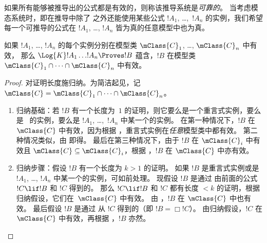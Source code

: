 \documentclass[../../../include/open-logic-section]{subfiles}
\begin{document}


如果所有能够被推导出的公式都是有效的，则称该推导系统是\emph{可靠的}。
当考虑模态系统时，即在推导中除了  之外还能使用某些公式 $!A_1$, \dots,~$!A_n$ 的实例，我们希望每一个可推导的公式在 $!A_1$, \dots, $!A_n$ 皆为真的任意模型中也为真。

\begin{thm}[可靠性定理]
  如果 $!A_1$, \dots, $!A_n$ 的每个实例分别在模型类 $\mClass{C}_1$, \dots, $\mClass{C}_n$ 中有效，
  那么 $\Log{K}!A_1\dots !A_n
  \Proves !B$ 蕴含，$!B$ 在模型类 $\mClass{C}_1 \cap \dots \cap \mClass{C}_n$ 中有效。
\end{thm}

\begin{proof}
  对证明长度施归纳。为简洁起见，记 $\mClass{C} =
  \mClass{C}_1 \cap \dots \cap \mClass{C}_n$。
  \begin{enumerate}
  \item 归纳基础：若 $!B$ 有一个长度为~$1$ 的证明，则它要么是一个重言式实例，要么是~ 的实例，要么是 $!A_1$, \dots,~$!A_n$ 中某一个的实例。
      在第一种情况下，$!B$ 在 $\mClass{C}$ 中有效，因为根据 ，重言式实例在\emph{任意}模型类中都有效。
      第二种情况类似，由  即得。
      最后在第三种情况下，由于 $!B$ 在 $\mClass{C}_i$ 中有效且 $\mClass{C} \subseteq
    \mClass{C}_i$，根据 ，$!B$ 在 $\mClass{C}$ 中亦有效。
  \item 归纳步骤：假设 $!B$ 有一个长度为 $k>1$ 的证明。
      如果 $!B$ 是重言式实例或是 $!A_1$, \dots, $!A_n$ 中某一个的实例，可如前处理。
      现假设 $!B$ 是通过\MP{} 由前面的公式 $!C \lif !B$ 和 $!C$ 得到的。
      那么 $!C \lif !B$ 和 $!C$ 都有长度 $<k$ 的证明，根据归纳假设，它们在~$\mClass{C}$ 中有效。
      由 ，$!B$ 在 $\mClass{C}$ 中也有效。
      最后假设 $!B$ 是通过\Nec{} 从 $!C$ 得到的（即 $!B = \Box!C$）。
      由归纳假设，$!C$ 在 $\mClass{C}$ 中有效，再根据 ，$!B$ 亦然。
  \end{enumerate}
\end{proof}
\end{document}
